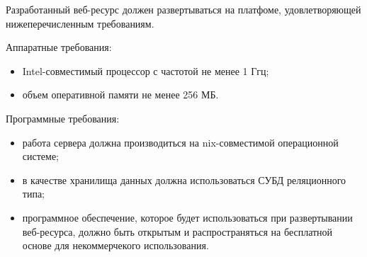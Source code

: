 Разработанный веб-ресурс должен развертываться на платфоме,
удовлетворяющей нижеперечисленным требованиям.

Аппаратные требования:
\begin{itemize}
\item Intel-совместимый процессор с частотой не менее 1 Ггц;
\item объем оперативной памяти не менее 256 МБ.
\end{itemize}

Программные требования:
\begin{itemize}
\item работа сервера должна производиться на nix-совместимой 
  операционной системе;
\item в качестве хранилища данных должна использоваться 
  СУБД реляционного типа;
\item программное обеспечение, которое будет использоваться при 
  развертывании веб-ресурса, должно быть открытым и распространяться 
  на бесплатной основе для некоммерчекого использования. 
\end{itemize}